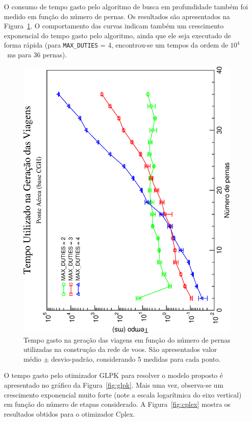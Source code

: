 \documentclass[12pt,a4paper]{article}
\begin{document}
O consumo de tempo gasto pelo algoritmo de busca em profundidade também foi medido em função do 
número de pernas. Os resultados são apresentados na Figura~\ref{fig:generation}. O comportamento das
curvas indicam também um crescimento exponencial do tempo gasto pelo algoritmo, ainda que ele seja
executado de forma rápida (para \verb|MAX_DUTIES| = 4, encontrou-se um tempos da ordem de $10^4$~ms 
para 36 pernas).

\begin{figure}[htb]
	\begin{center}
		\includegraphics[scale=0.45,angle=-90]{fig/generation_time.eps}
		\caption{Tempo gasto na geração das viagens em função do número de pernas utilizadas na 
		construção da rede de voos. São apresentados valor médio $\pm$ desvio-padrão, considerando 5 
		medidas para cada ponto.}
		\label{fig:generation}
	\end{center}
\end{figure}

O tempo gasto pelo otimizador GLPK para resolver o modelo proposto é apresentado no gráfico da 
Figura~\ref{fig:glpk}. Mais uma vez, observa-se um crescimento exponencial muito forte (note a 
escala logarítmica do eixo vertical) em função do número de etapas considerado. A 
Figura~\ref{fig:cplex} mostra os resultados obtidos para o otimizador Cplex. 
\end{document}
